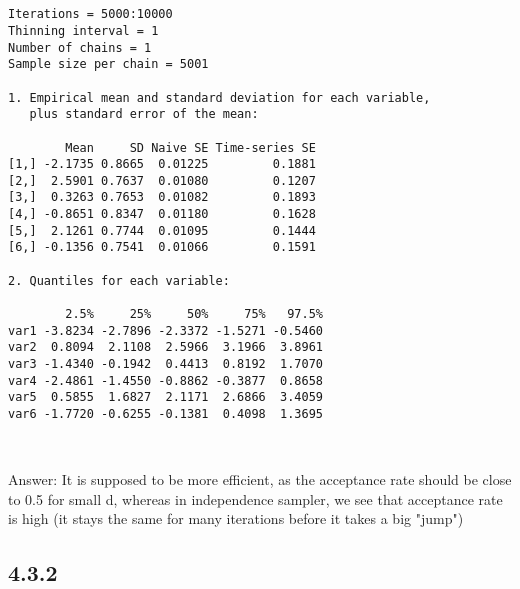 \documentclass[11pt]{article}
\begin{document}
    \begin{center}
    \end{center}
    { \hspace*{\fill} \\}
    
    
    \begin{verbatim}

Iterations = 5000:10000
Thinning interval = 1 
Number of chains = 1 
Sample size per chain = 5001 

1. Empirical mean and standard deviation for each variable,
   plus standard error of the mean:

        Mean     SD Naive SE Time-series SE
[1,] -2.1735 0.8665  0.01225         0.1881
[2,]  2.5901 0.7637  0.01080         0.1207
[3,]  0.3263 0.7653  0.01082         0.1893
[4,] -0.8651 0.8347  0.01180         0.1628
[5,]  2.1261 0.7744  0.01095         0.1444
[6,] -0.1356 0.7541  0.01066         0.1591

2. Quantiles for each variable:

        2.5%     25%     50%     75%   97.5%
var1 -3.8234 -2.7896 -2.3372 -1.5271 -0.5460
var2  0.8094  2.1108  2.5966  3.1966  3.8961
var3 -1.4340 -0.1942  0.4413  0.8192  1.7070
var4 -2.4861 -1.4550 -0.8862 -0.3877  0.8658
var5  0.5855  1.6827  2.1171  2.6866  3.4059
var6 -1.7720 -0.6255 -0.1381  0.4098  1.3695

    \end{verbatim}

    
    \begin{center}
    \end{center}
    { \hspace*{\fill} \\}
    
    Answer: It is supposed to be more efficient, as the acceptance rate
should be close to 0.5 for small d, whereas in independence sampler, we
see that acceptance rate is high (it stays the same for many iterations
before it takes a big "jump")

    \subsection{4.3.2}\label{section}
\end{document}
